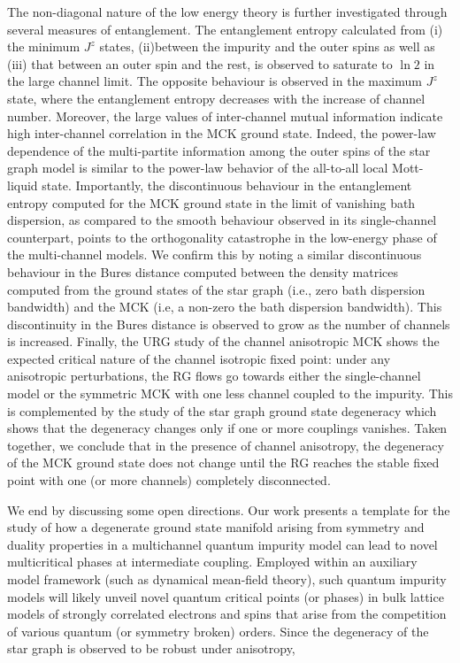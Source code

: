 \documentclass{iopart}
\begin{document}
\par 
The non-diagonal nature of the low energy theory is further investigated through several measures of entanglement. The entanglement entropy calculated from (i) the minimum \(J^z\) states, (ii)between the impurity and the outer spins as well as (iii) that between an outer spin and the rest, is observed to saturate to \(\ln 2\) in the large channel limit. The opposite behaviour is observed in the maximum $J^z$ state, where the entanglement entropy decreases with the increase of channel number. Moreover, the large values of inter-channel mutual information indicate high inter-channel correlation in the MCK ground state.
Indeed, the power-law dependence of the multi-partite information among the outer spins of the star graph model is similar to the power-law behavior of the all-to-all local Mott-liquid state. Importantly, the discontinuous behaviour in the entanglement entropy computed for the MCK ground state in the limit of vanishing bath dispersion, as compared to the smooth behaviour observed in its single-channel counterpart, points to the orthogonality catastrophe in the low-energy phase of the multi-channel models. We confirm this by noting a similar discontinuous behaviour in the Bures distance computed between the density matrices computed from the ground states of the star graph (i.e., zero bath dispersion bandwidth) and the MCK (i.e, a non-zero the bath dispersion bandwidth). This discontinuity in the Bures distance is observed to grow as the number of channels is increased. Finally, the URG study of the channel anisotropic MCK shows the expected critical nature of the channel isotropic fixed point: under any anisotropic perturbations, the RG flows go towards either the single-channel model or the symmetric MCK with one less channel coupled to the impurity. This is complemented by the study of the star graph ground state degeneracy which shows that the degeneracy changes only if one or more couplings vanishes.
Taken together, we conclude that in the presence of channel anisotropy, the degeneracy of the MCK ground state does not change until the RG reaches the stable fixed point with one (or more channels) completely disconnected.
\par 
We end by discussing some open directions. 
Our work presents a template for the study of how a degenerate ground state manifold arising from symmetry and duality properties in a multichannel quantum impurity model can lead to novel multicritical phases at intermediate coupling. Employed within an auxiliary model framework (such as dynamical mean-field theory), such quantum impurity models will likely unveil novel quantum critical points (or phases) in bulk lattice models of strongly correlated electrons and spins that arise from the competition of various quantum (or symmetry broken) orders. Since the degeneracy of the star graph is observed to be robust under anisotropy, 
\end{document}
